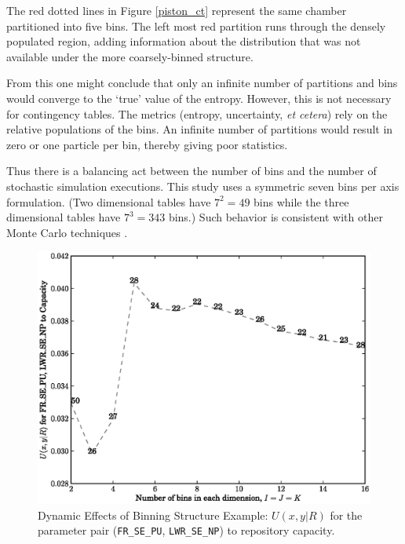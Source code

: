 The red dotted lines in Figure \ref{piston_ct} represent the same chamber partitioned into 
five bins.  The left most red partition runs through the
densely populated region, adding information about the distribution that was not available 
under the more coarsely-binned structure.

From this one might conclude that only an infinite number of partitions and bins would converge 
to the `true' value of the entropy.  However, this is not necessary for contingency tables.  
The metrics (entropy, uncertainty, \emph{et cetera}) rely on the relative populations of the bins.
An infinite number of partitions would result in zero or one particle per bin, thereby 
giving poor statistics.

Thus there is a balancing act between the number of bins and the number of stochastic 
simulation executions.  This study uses a symmetric seven bins per axis formulation.  
(Two dimensional tables have $7^2=49$ bins while the three dimensional tables have
$7^3=343$ bins.)
Such behavior is consistent with other Monte Carlo techniques \cite{Press2007}.

\begin{figure}[htbp]
\begin{center}
\includegraphics[scale=0.70]{ct_sensitivity/figs/U_xy_R_for_FR_SE_PU_and_LWR_SE_NP_to_Capacity_rank.eps}
\caption{Dynamic Effects of Binning Structure Example: $U(x,y|R)$ for the parameter pair (\texttt{FR\_SE\_PU}, \texttt{LWR\_SE\_NP}) to repository capacity.}
\label{dynamic_effects}
\end{center}
\end{figure}

